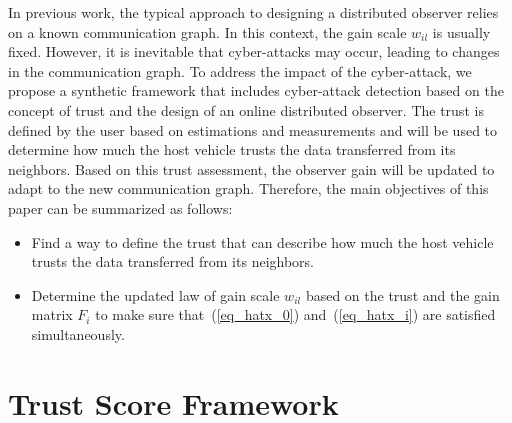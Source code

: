 \documentclass[letterpaper, 10pt, conference]{ieeeconf}  %
\def\eqref#1{(\ref{#1})}
\begin{document}
In previous work, the typical approach to designing a distributed observer relies on a known communication graph. In this context, the gain scale $w_{i l}$ is usually fixed. 
However, it is inevitable that cyber-attacks may occur, leading to changes in the communication graph.
To address the impact of the cyber-attack, we propose a synthetic framework that includes cyber-attack detection based on the concept of trust and the design of an online distributed observer. The trust is defined by the user based on estimations and measurements and will be used to determine how much the host vehicle trusts the data transferred from its neighbors. Based on this trust assessment, the observer gain will be updated to adapt to the new communication graph. Therefore, the main objectives of this paper can be summarized as follows:
\begin{itemize}
    \item Find a way to define the trust that can describe how much the host vehicle trusts the data transferred from its neighbors.
    \item Determine the updated law of gain scale $w_{i l}$ based on the trust and the gain matrix $F_{i}$ to make sure that~\eqref{eq_hatx_0} and~\eqref{eq_hatx_i} are satisfied simultaneously.
\end{itemize}



\section{Trust Score Framework}\label{sec_trust_score}

\end{document}
